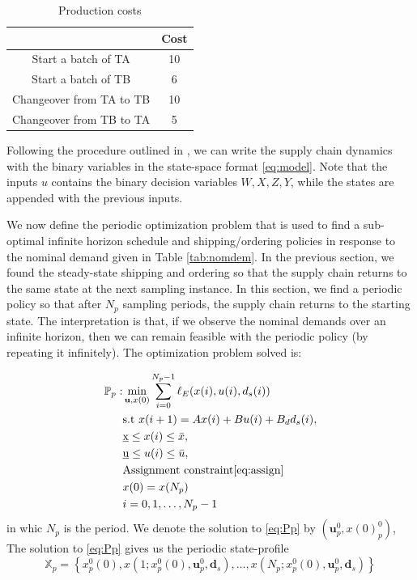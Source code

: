 \documentclass[10pt]{article}
\newcommand{\bu}{\mathbf{u}}
\newcommand{\bd}{\mathbf{d}}
\newcommand{\set}[1]{\left\lbrace #1 \right\rbrace}
\theoremstyle{definition}
\begin{document}
\begin{table}
\caption{Production costs}
\label{tab:sched_prod}
\begin{center}
\begin{tabular}{cc}\toprule
 &Cost \\ \midrule
Start a batch of TA & 10\\
Start a batch of TB & 6 \\
Changeover from TA to TB & 10\\
Changeover from TB to TA & 5\\
\bottomrule 
\end{tabular}
\end{center}
\end{table}


Following the procedure outlined in
\citet{subramanian:maravelias:rawlings:2012}, we can write the supply
chain dynamics with the binary variables in the state-space format
\eqref{eq:model}. Note that the inputs $u$ contains the binary
decision variables $W,X,Z,Y$, while the states are appended with the
previous inputs.

We now define the periodic optimization problem that is used to find a
sub-optimal infinite horizon schedule and shipping/ordering policies
in response to the nominal demand given in Table \ref{tab:nomdem}. In
the previous section, we found the steady-state shipping and ordering
so that the supply chain returns to the same state at the next
sampling instance. In this section, we find a periodic policy 
so that after $N_{p}$ sampling periods, the supply chain returns to the starting
state. The interpretation is that, if we observe the  nominal demands over
an infinite horizon, then we can remain feasible with the periodic
policy (by repeating it infinitely).
The optimization problem solved is:

\begin{alignat}{1}
\label{eq:Pp}
\mathbb{P}_p:& \min_{\bu,x(0)}{\sum_{i=0}^{N_p-1}\ell_E(x(i),u(i),d_s(i))} \nonumber \\
&\text{s.t~} x(i+1) = Ax(i) + Bu(i)+B_dd_s(i), \nonumber\\
&\underbar{x} \leq x(i) \leq \bar{x},  \\
&\underbar{u} \leq u(i) \leq \bar{u}, \nonumber \\
& \text{Assignment constraint}\eqref{eq:assign} \nonumber\\
& x(0) = x(N_p) \nonumber\\
&i = 0,1,\ldots,N_p-1\nonumber
\end{alignat}
in whic $N_p$ is the period.  We denote the solution to
\eqref{eq:Pp} by $(\mathbf{u}_p^0,x(0)_p^0)$,
The solution to \eqref{eq:Pp} gives us the periodic state-profile
\begin{equation}
\label{eq:Xperiodic}
\mathbb{X}_p =  \set {x^0_p(0),x(1;x^0_p(0),\bu_p^0,\bd_s),\ldots,x(N_p;x^0_p(0),\bu_p^0,\bd_s) }
\end{equation}
\end{document}

